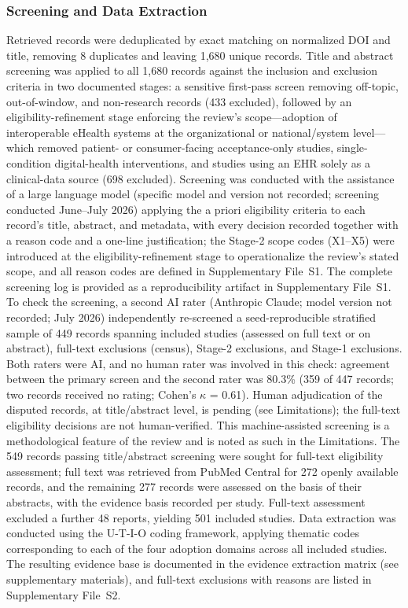 \subsubsection{Screening and Data Extraction}

Retrieved records were deduplicated by exact matching on normalized DOI and title, removing 8 duplicates and leaving 1,680 unique records. Title and abstract screening was applied to all 1,680 records against the inclusion and exclusion criteria in two documented stages: a sensitive first-pass screen removing off-topic, out-of-window, and non-research records (433 excluded), followed by an eligibility-refinement stage enforcing the review's scope—adoption of interoperable eHealth systems at the organizational or national/system level—which removed patient- or consumer-facing acceptance-only studies, single-condition digital-health interventions, and studies using an EHR solely as a clinical-data source (698 excluded). Screening was conducted with the assistance of a large language model (specific model and version not recorded; screening conducted June--July 2026) applying the a priori eligibility criteria to each record's title, abstract, and metadata, with every decision recorded together with a reason code and a one-line justification; the Stage-2 scope codes (X1--X5) were introduced at the eligibility-refinement stage to operationalize the review's stated scope, and all reason codes are defined in Supplementary File~S1. The complete screening log is provided as a reproducibility artifact in Supplementary File~S1. To check the screening, a second AI rater (Anthropic Claude; model version not recorded; July 2026) independently re-screened a seed-reproducible stratified sample of 449 records spanning included studies (assessed on full text or on abstract), full-text exclusions (census), Stage-2 exclusions, and Stage-1 exclusions. Both raters were AI, and no human rater was involved in this check: agreement between the primary screen and the second rater was 80.3\% (359 of 447 records; two records received no rating; Cohen's $\kappa$ = 0.61). Human adjudication of the disputed records, at title/abstract level, is pending (see Limitations); the full-text eligibility decisions are not human-verified. %
This machine-assisted screening is a methodological feature of the review and is noted as such in the Limitations. The 549 records passing title/abstract screening were sought for full-text eligibility assessment; full text was retrieved from PubMed Central for 272 openly available records, and the remaining 277 records were assessed on the basis of their abstracts, with the evidence basis recorded per study. Full-text assessment excluded a further 48 reports, yielding 501 included studies. Data extraction was conducted using the U-T-I-O coding framework, applying thematic codes corresponding to each of the four adoption domains across all included studies. The resulting evidence base is documented in the evidence extraction matrix (see supplementary materials), and full-text exclusions with reasons are listed in Supplementary File~S2.

